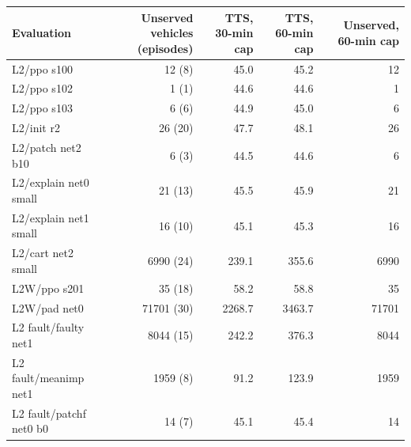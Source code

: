 \begin{tabular}{lrrrr}
\toprule
Evaluation & Unserved vehicles (episodes) & TTS, 30-min cap & TTS, 60-min cap & Unserved, 60-min cap \\
\midrule
L2/ppo s100 & 12 (8) & 45.0 & 45.2 & 12 \\
L2/ppo s102 & 1 (1) & 44.6 & 44.6 & 1 \\
L2/ppo s103 & 6 (6) & 44.9 & 45.0 & 6 \\
L2/init r2 & 26 (20) & 47.7 & 48.1 & 26 \\
L2/patch net2 b10 & 6 (3) & 44.5 & 44.6 & 6 \\
L2/explain net0 small & 21 (13) & 45.5 & 45.9 & 21 \\
L2/explain net1 small & 16 (10) & 45.1 & 45.3 & 16 \\
L2/cart net2 small & 6990 (24) & 239.1 & 355.6 & 6990 \\
L2W/ppo s201 & 35 (18) & 58.2 & 58.8 & 35 \\
L2W/pad net0 & 71701 (30) & 2268.7 & 3463.7 & 71701 \\
L2 fault/faulty net1 & 8044 (15) & 242.2 & 376.3 & 8044 \\
L2 fault/meanimp net1 & 1959 (8) & 91.2 & 123.9 & 1959 \\
L2 fault/patchf net0 b0 & 14 (7) & 45.1 & 45.4 & 14 \\
\bottomrule
\end{tabular}
